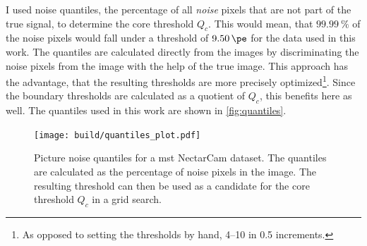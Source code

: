 I used noise quantiles, \ie the percentage of all \textit{noise} pixels that are not part of the true signal,
to determine the core threshold \(Q_c\). This would mean, that \eg \(\SI{99.99}{\percent}\)
of the noise pixels would fall under a threshold of \(\SI{9.50}{\pe}\) for the data used in this work. The quantiles are calculated directly from the images by
discriminating the noise pixels from the image with the help of the true image. This approach has the
advantage, that the resulting thresholds are more precisely optimized\footnote{As opposed to setting the thresholds by hand, \eg \numrange{4}{10} in \num{0.5} increments.}.
Since the boundary thresholds are calculated as a quotient of \(Q_c\), this benefits here as well.
The quantiles used in this work are shown in \autoref{fig:quantiles}.
\begin{figure}
    \centering
    \texttt{[image: build/quantiles\_plot.pdf]}
    \caption{Picture noise quantiles for a \gls{mst} NectarCam dataset. The quantiles are calculated
    as the percentage of noise pixels in the image. The resulting threshold can then be used as a
    candidate for the core threshold \(Q_c\) in a grid search.}%
    \label{fig:quantiles}
    \vspace{-0.5cm}
\end{figure}

